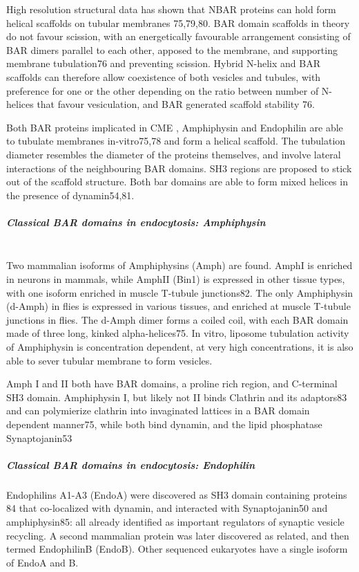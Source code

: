 \vspace{5mm}
High resolution structural data has shown that NBAR proteins can hold form helical scaffolds on tubular membranes 75,79,80. BAR domain scaffolds in theory do not favour scission, with an energetically favourable arrangement consisting of BAR dimers parallel to each other, apposed to the membrane, and supporting membrane tubulation76 and preventing scission. Hybrid N-helix and BAR scaffolds can therefore allow coexistence of both vesicles and tubules, with preference for one or the other depending on the ratio between number of N-helices that favour vesiculation, and BAR generated scaffold stability 76. 

\vspace{5mm}
Both BAR proteins implicated in CME , Amphiphysin and Endophilin are able to tubulate membranes in-vitro75,78 and form a helical scaffold. The tubulation diameter resembles the diameter of the proteins themselves, and involve lateral interactions of the neighbouring BAR domains. SH3 regions are proposed to stick out of the scaffold structure. Both bar domains are able to form mixed helices in the presence of dynamin54,81. 


		\subparagraph{Classical BAR domains in endocytosis: Amphiphysin}
\mbox{} \\
Two mammalian isoforms of Amphiphysins (Amph) are found. AmphI is enriched in neurons in mammals, while AmphII (Bin1) is expressed in other tissue types, with one isoform enriched in muscle T-tubule junctions82. The only Amphiphysin (d-Amph) in flies is expressed in various tissues, and enriched at muscle T-tubule junctions in flies. The d-Amph dimer forms a coiled coil, with each BAR domain made of three long, kinked alpha-helices75. In vitro, liposome tubulation activity of Amphiphysin is concentration dependent, at very high concentrations, it is also able to sever tubular membrane to form vesicles. 

\vspace{5mm}
Amph I and II both have BAR domains, a proline rich region, and C-terminal SH3 domain.
Amphiphysin I, but likely not II binds Clathrin and its adaptors83 and can polymierize clathrin into invaginated lattices in a BAR domain dependent manner75, while both bind dynamin, and the lipid phosphatase Synaptojanin53


		\subparagraph{Classical BAR domains in endocytosis: Endophilin}
Endophilins A1-A3 (EndoA) were discovered as SH3 domain containing proteins 84 that co-localized with dynamin, and interacted with Synaptojanin50 and amphiphysin85: all already identified as important regulators of synaptic vesicle recycling. A second mammalian protein was later discovered as related, and then termed EndophilinB (EndoB). Other sequenced eukaryotes have a single isoform of EndoA and B.

